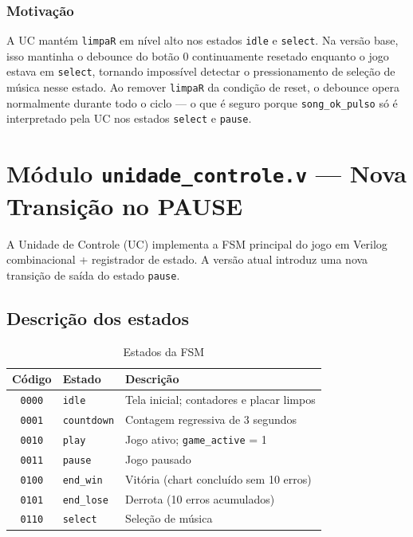 \documentclass[12pt, a4paper]{article}
\newcommand{\vsig}[1]{\texttt{#1}}
\begin{document}
\subsubsection{Motivação}

A UC mantém \vsig{limpaR} em nível alto nos estados \texttt{idle} e
\texttt{select}. Na versão base, isso mantinha o debounce do botão 0
continuamente resetado enquanto o jogo estava em \texttt{select}, tornando
impossível detectar o pressionamento de seleção de música nesse estado.
Ao remover \vsig{limpaR} da condição de reset, o debounce opera normalmente
durante todo o ciclo — o que é seguro porque \vsig{song\_ok\_pulso} só é
interpretado pela UC nos estados \texttt{select} e \texttt{pause}.

\section{Módulo \texttt{unidade\_controle.v} — Nova Transição no PAUSE}

A Unidade de Controle (UC) implementa a FSM principal do jogo em Verilog
combinacional + registrador de estado. A versão atual introduz uma nova
transição de saída do estado \texttt{pause}.

\subsection{Descrição dos estados}

\begin{table}[h!]
\centering
\caption{Estados da FSM}
\label{tab:estados}
\begin{tabular}{clp{8cm}}
\toprule
\textbf{Código} & \textbf{Estado} & \textbf{Descrição} \\
\midrule
\texttt{0000} & \texttt{idle}      & Tela inicial; contadores e placar limpos \\
\texttt{0001} & \texttt{countdown} & Contagem regressiva de 3 segundos \\
\texttt{0010} & \texttt{play}      & Jogo ativo; \texttt{game\_active} = 1 \\
\texttt{0011} & \texttt{pause}     & Jogo pausado \\
\texttt{0100} & \texttt{end\_win}  & Vitória (chart concluído sem 10 erros) \\
\texttt{0101} & \texttt{end\_lose} & Derrota (10 erros acumulados) \\
\texttt{0110} & \texttt{select}    & Seleção de música \\
\bottomrule
\end{tabular}
\end{table}
\end{document}
